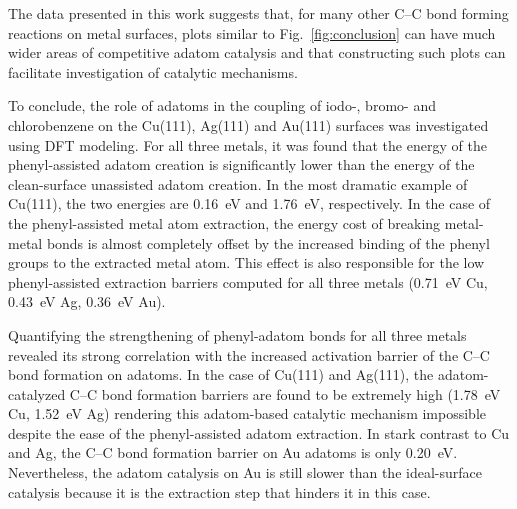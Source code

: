 \documentclass[aps,prb,amsmath,amssymb,11pt]{revtex4-1}
\begin{document}

The data presented in this work suggests that, for many other C--C bond forming reactions on metal surfaces, plots similar to Fig.~\ref{fig:conclusion} can have much wider areas of competitive adatom catalysis and that constructing such plots can facilitate investigation of catalytic mechanisms. 


To conclude, the role of adatoms in the coupling of iodo-, bromo- and chlorobenzene on the Cu(111), Ag(111) and Au(111) surfaces was investigated using DFT modeling. For all three metals, it was found that the energy of the phenyl-assisted adatom creation is significantly lower than the energy of the clean-surface unassisted adatom creation. In the most dramatic example of Cu(111), the two energies are \SI{0.16}{\electronvolt} and \SI{1.76}{\electronvolt}, respectively. In the case of the phenyl-assisted metal atom extraction, the energy cost of breaking metal-metal bonds is almost completely offset by the increased binding of the phenyl groups to the extracted metal atom. This effect is also responsible for the low phenyl-assisted extraction barriers computed for all three metals (\SI{0.71}{\electronvolt} Cu, \SI{0.43}{\electronvolt} Ag, \SI{0.36}{\electronvolt} Au). 

Quantifying the strengthening of phenyl-adatom bonds for all three metals revealed its strong correlation with the increased activation barrier of the C--C bond formation on adatoms. In the case of Cu(111) and Ag(111), the adatom-catalyzed C--C bond formation barriers are found to be extremely high (\SI{1.78}{\electronvolt} Cu, \SI{1.52}{\electronvolt} Ag) rendering this adatom-based catalytic mechanism impossible despite the ease of the phenyl-assisted adatom extraction. 
In stark contrast to Cu and Ag, the C--C bond formation barrier on Au adatoms is only \SI{0.20}{\electronvolt}. Nevertheless, the adatom catalysis on Au is still slower than the ideal-surface catalysis because it is the extraction step that hinders it in this case.
\end{document}
